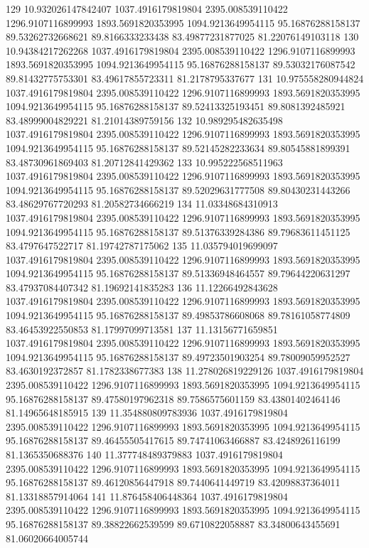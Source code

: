 {129 10.932026147842407 1037.4916179819804 2395.008539110422 1296.9107116899993 1893.5691820353995 1094.9213649954115 95.16876288158137 89.53262732668621 89.8166333233438 83.49877231877025 81.22076149103118
130 10.94384217262268 1037.4916179819804 2395.008539110422 1296.9107116899993 1893.5691820353995 1094.9213649954115 95.16876288158137 89.53032176087542 89.81432775753301 83.49617855723311 81.2178795337677
131 10.975558280944824 1037.4916179819804 2395.008539110422 1296.9107116899993 1893.5691820353995 1094.9213649954115 95.16876288158137 89.52413325193451 89.8081392485921 83.48999004829221 81.21014389759156
132 10.989295482635498 1037.4916179819804 2395.008539110422 1296.9107116899993 1893.5691820353995 1094.9213649954115 95.16876288158137 89.52145282233634 89.80545881899391 83.48730961869403 81.20712841429362
133 10.995222568511963 1037.4916179819804 2395.008539110422 1296.9107116899993 1893.5691820353995 1094.9213649954115 95.16876288158137 89.52029631777508 89.80430231443266 83.48629767720293 81.20582734666219
134 11.03348684310913 1037.4916179819804 2395.008539110422 1296.9107116899993 1893.5691820353995 1094.9213649954115 95.16876288158137 89.51376339284386 89.79683611451125 83.4797647522717 81.19742787175062
135 11.035794019699097 1037.4916179819804 2395.008539110422 1296.9107116899993 1893.5691820353995 1094.9213649954115 95.16876288158137 89.51336948464557 89.79644220631297 83.47937084407342 81.19692141835283
136 11.12266492843628 1037.4916179819804 2395.008539110422 1296.9107116899993 1893.5691820353995 1094.9213649954115 95.16876288158137 89.49853786608068 89.78161058774809 83.46453922550853 81.17997099713581
137 11.13156771659851 1037.4916179819804 2395.008539110422 1296.9107116899993 1893.5691820353995 1094.9213649954115 95.16876288158137 89.49723501903254 89.78009059952527 83.4630192372857 81.1782338677383
138 11.278026819229126 1037.4916179819804 2395.008539110422 1296.9107116899993 1893.5691820353995 1094.9213649954115 95.16876288158137 89.47580197962318 89.7586575601159 83.43801402464146 81.14965648185915
139 11.354880809783936 1037.4916179819804 2395.008539110422 1296.9107116899993 1893.5691820353995 1094.9213649954115 95.16876288158137 89.46455505417615 89.74741063466887 83.4248926116199 81.1365350688376
140 11.377748489379883 1037.4916179819804 2395.008539110422 1296.9107116899993 1893.5691820353995 1094.9213649954115 95.16876288158137 89.46120856447918 89.7440641449719 83.42098837364011 81.13318857914064
141 11.876458406448364 1037.4916179819804 2395.008539110422 1296.9107116899993 1893.5691820353995 1094.9213649954115 95.16876288158137 89.38822662539599 89.6710822058887 83.34800643455691 81.06020664005744
}
